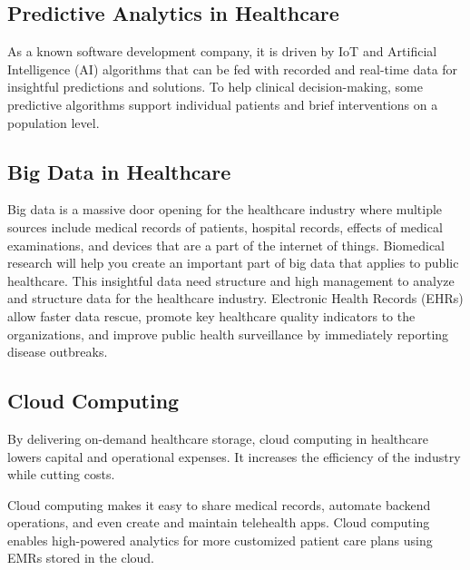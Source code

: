 \documentclass[12pt]{article}
\begin{document}
\subsection{Predictive Analytics in Healthcare}
As a known software development company, it is driven by IoT and Artificial Intelligence (AI) algorithms that can be fed with recorded and real-time data for insightful predictions and solutions.
To help clinical decision-making, some predictive algorithms support individual patients and brief interventions on a population level.
\subsection{Big Data in Healthcare}
Big data is a massive door opening for the healthcare industry where multiple sources include medical records of patients, hospital records, effects of medical examinations, and devices that are a part of the internet of things.
Biomedical research will help you create an important part of big data that applies to public healthcare. This insightful data need structure and high management to analyze and structure data for the healthcare industry.
Electronic Health Records (EHRs) allow faster data rescue, promote key healthcare quality indicators to the organizations, and improve public health surveillance by immediately reporting disease outbreaks.
 \subsection{Cloud Computing}
By delivering on-demand healthcare storage, cloud computing in healthcare lowers capital and operational expenses. It increases the efficiency of the industry while cutting costs.

Cloud computing makes it easy to share medical records, automate backend operations, and even create and maintain telehealth apps.
Cloud computing enables high-powered analytics for more customized patient care plans using EMRs stored in the cloud.
\end{document}

